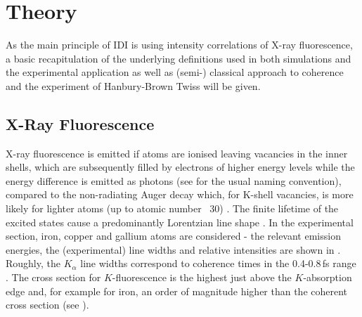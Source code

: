 \chapter{Theory}
\label{chap:theory}
As the main principle of IDI is using intensity correlations of X-ray fluorescence, a basic recapitulation of the underlying definitions used in both simulations and the experimental application as well as (semi-) classical approach to coherence and the experiment of Hanbury-Brown Twiss will be given.


\section{X-Ray Fluorescence}
X-ray fluorescence is emitted if atoms are ionised leaving vacancies in the inner shells, which are subsequently filled by electrons of higher energy levels while the energy difference is emitted as photons  (see  for the usual naming convention), compared to the non-radiating Auger decay which, for K-shell vacancies, is more likely for lighter atoms (up to atomic number ~30) \cite{santra2009}.  The finite lifetime of the excited states cause a predominantly Lorentzian line shape \cite{attwood1999,van2001}. In the experimental section, iron, copper and gallium atoms are considered - the relevant emission energies, the (experimental) line widths and relative intensities are shown in .   Roughly, the $K_\alpha$ line widths correspond to coherence times in the 0.4-0.8\,fs range \cite{krause1979}. The cross section for $K$-fluorescence is the highest just above the $K$-absorption edge and, for example for iron, an order of magnitude higher than the coherent cross section (see ).

